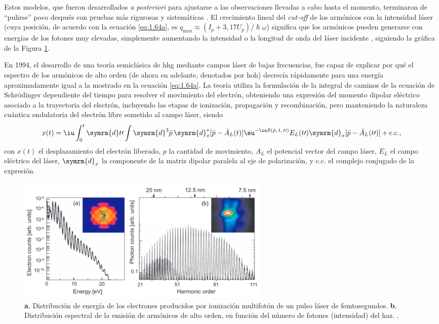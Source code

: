 Estos modelos, que fueron desarrollados \emph{a posteriori} para ajustarse a las observaciones llevadas a cabo hasta el momento, terminaron de \enquote{pulirse} poco después con pruebas más rigurosas y sistemáticas \autocite{Chang1997}. El crecimiento lineal del \emph{cut-off} de los armónicos con la intensidad láser (cuya posición, de acuerdo con la ecuación \eqref{eq:1.64a}, es $q_{\mathrm{max}} \approx (I_{p}+3,17U_{p})/\hslash \omega$) significa que los armónicos pueden generarse con energías de los fotones muy elevadas, simplemente aumentando la intensidad o la longitud de onda del láser incidente \autocite{Spielmann1997}, siguiendo la gráfica de la Figura \ref{fig:1.20}.

En 1994, el desarrollo de una teoría semiclásica de \acrshort{hhg} mediante campos láser de bajas frecuencias, fue capaz de explicar por qué el espectro de los armónicos de alto orden (de ahora en adelante, denotados por \acrshort{hoh}) decrecía rápidamente para una energía aproximadamente igual a la mostrado en la ecuación \eqref{eq:1.64a}. La teoría utiliza la formulación de la integral de caminos de la ecuación de Schrödinger dependiente del tiempo para resolver el movimiento del electrón, obteniendo una expresión del momento dipolar eléctrico asociado a la trayectoria del electrón, incluyendo las etapas de ionización, propagación y recombinación, pero manteniendo la naturaleza cuántica ondulatoria del electrón libre sometido al campo láser, siendo
\begin{equation}\label{eq:1.65}
x(t) = \iu \int_{0}^{t} \symrm{d}t\prime \int \symrm{d}^{3}\bar{p}\,\symrm{d}^{*}_{x}[\bar{p}-\bar{A}_{L}(t)]\eu^{-\iu S(\bar{p},\,t,\,t \prime)} E_{L}(t \prime )\symrm{d}_{x}[\bar{p}-\bar{A}_{L}(t \prime )] + \mathrm{c.c.},
\end{equation}
con $x(t)$ el desplazamiento del electrón liberado, $p$ la cantidad de movimiento, $A_{L}$ el potencial vector del campo láser, $E_{L}$ el campo eléctrico del láser, $\symrm{d}_{x}$ la componente de la matriz dipolar paralela al eje de polarización, y $\mathrm{c.c.}$ el complejo conjugado de la expresión.

\begin{figure}[htbp]
  \centering
  \includegraphics[width=0.6\textwidth]{Figuras/ch1_hhspectra.png}
  \caption{\textbf{a}, Distribución de energía de los electrones producidos por ionización multifotón de un pulso láser de femtosegundos. \textbf{b}, Distribución espectral de la emisión de armónicos de alto orden, en función del número de fotones (intensidad) del haz. \autocite{Krausz2009}.}
  \label{fig:1.20}
\end{figure}


